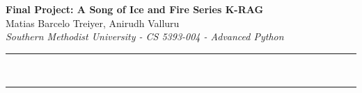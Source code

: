 \documentclass[a4paper,12pt]{article}
\renewenvironment{abstract}
 {\par\noindent\textbf{\abstractname}\ \ignorespaces \\}
 {\par\noindent\medskip}
\begin{document}
\pagestyle{fancy}
\thispagestyle{empty}
\fancyhead[R]{}
\fancyhead[L]{}
\renewcommand*{\thefootnote}{\fnsymbol{footnote}}
\vspace*{2cm}
\begin{center}
\Large{\textbf{Final Project: A Song of Ice and Fire Series K-RAG}}
\vspace{0.4cm}
\normalsize
\\ Matias Barcelo Treiyer, Anirudh Valluru \\
\vspace{0.1cm}
\textit{Southern Methodist University - CS 5393-004 - Advanced Python}
\medskip
\normalsize
\end{center}
{\color{gray}\hrule}
\vspace{0.4cm}
\begin{abstract}

\end{abstract}
{\color{gray}\hrule}
\vspace*{\fill}

\newpage
\tableofcontents
\bigskip






\end{document}
